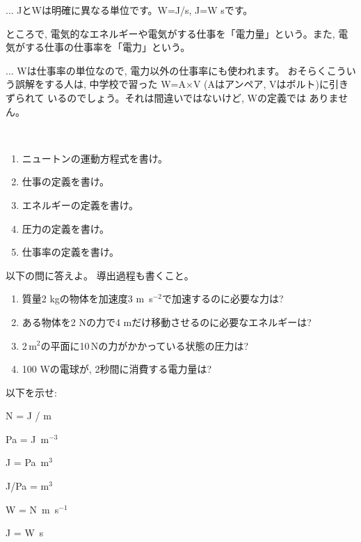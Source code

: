 \begin{freqmiss}{\small{} ... 
JとWは明確に異なる単位です。W=J/s, J=W sです。}\end{freqmiss}

ところで, 電気的なエネルギーや電気がする仕事を「電力量」という。また, 
電気がする仕事の仕事率を「電力」という。

\begin{freqmiss}{\small{} ... 
Wは仕事率の単位なので, 電力以外の仕事率にも使われます。
おそらくこういう誤解をする人は, 中学校で習った
W=A$\times$V (Aはアンペア, Vはボルト)に引きずられて
いるのでしょう。それは間違いではないけど, Wの定義では
ありません。}\end{freqmiss}

\begin{q}\label{q:state_F=ma_etc}　
\begin{enumerate}
\item ニュートンの運動方程式を書け。
\item 仕事の定義を書け。
\item エネルギーの定義を書け。
\item 圧力の定義を書け。
\item 仕事率の定義を書け。
\end{enumerate}\end{q}

\begin{q}\label{q:unit_NJPaW_matome7} 以下の問に答えよ。
導出過程も書くこと。
\begin{enumerate}
\item 質量2$\,\,$kgの物体を加速度3 m~s$^{-2}$で加速するのに必要な力は?
\item ある物体を2 Nの力で4 mだけ移動させるのに必要なエネルギーは?
\item 2$\,$m$^2$の平面に10$\,$Nの力がかかっている状態の圧力は?
\item 100$\,\,$Wの電球が, 2秒間に消費する電力量は?
\end{enumerate}
\end{q}

\begin{q}\label{q:unit_NJPaW_relation} 以下を示せ:
\begin{edaenumerate}
\item N = J / m
\item Pa = J~m$^{-3}$
\item J = Pa~m$^3$
\item J/Pa = m$^3$
\item W = N~m~s$^{-1}$
\item J = W~s
\end{edaenumerate}
\end{q}
\mv

